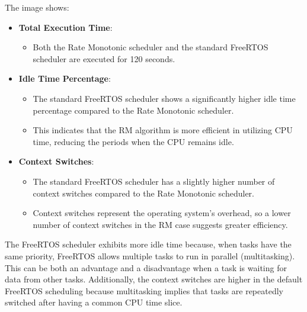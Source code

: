 The image shows:
\begin{itemize}
    \item \textbf{Total Execution Time}:
    \begin{itemize}
        \item Both the Rate Monotonic scheduler and the standard FreeRTOS scheduler are executed for 120 seconds.
    \end{itemize}
    \item \textbf{Idle Time Percentage}:
    \begin{itemize}
        \item The standard FreeRTOS scheduler shows a significantly higher idle time percentage compared to the Rate Monotonic scheduler.
        \item This indicates that the RM algorithm is more efficient in utilizing CPU time, reducing the periods when the CPU remains idle.
    \end{itemize}
    \item \textbf{Context Switches}:
    \begin{itemize}
        \item The standard FreeRTOS scheduler has a slightly higher number of context switches compared to the Rate Monotonic scheduler.
        \item Context switches represent the operating system's overhead, so a lower number of context switches in the RM case suggests greater efficiency.
    \end{itemize}
\end{itemize}

\noindent The FreeRTOS scheduler exhibits more idle time because, when tasks have the same priority, FreeRTOS allows multiple tasks to run in parallel (multitasking). This can be both an advantage and a disadvantage when a task is waiting for data from other tasks. Additionally, the context switches are higher in the default FreeRTOS scheduling because multitasking implies that tasks are repeatedly switched after having a common CPU time slice.